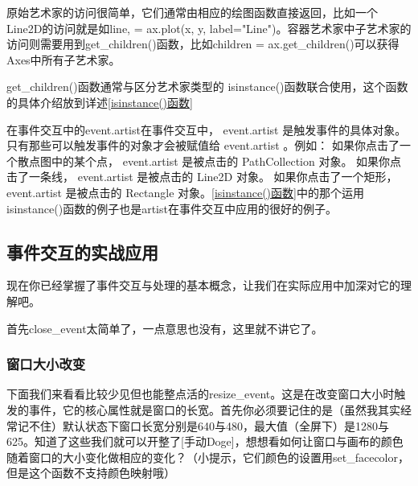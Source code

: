 \documentclass[12pt]{article}
\begin{document}
原始艺术家的访问很简单，它们通常由相应的绘图函数直接返回，比如一个Line2D的访问就是如line, = ax.plot(x, y, label="Line")。容器艺术家中子艺术家的访问则需要用到get\_children()函数，比如children = ax.get\_children()可以获得Axes中所有子艺术家。

get\_children()函数通常与区分艺术家类型的 isinstance()函数联合使用，这个函数的具体介绍放到详述\ref{isinstance()函数}

在事件交互中的event.artist在事件交互中，  event.artist   是触发事件的具体对象。只有那些可以触发事件的对象才会被赋值给   event.artist  。例如： 如果你点击了一个散点图中的某个点，  event.artist   是被点击的   PathCollection   对象。 如果你点击了一条线，  event.artist   是被点击的   Line2D   对象。 如果你点击了一个矩形， event.artist   是被点击的   Rectangle   对象。\ref{isinstance()函数}中的那个运用isinstance()函数的例子也是artist在事件交互中应用的很好的例子。

\subsection{事件交互的实战应用}
现在你已经掌握了事件交互与处理的基本概念，让我们在实际应用中加深对它的理解吧。

首先close\_event太简单了，一点意思也没有，这里就不讲它了。
\subsubsection{窗口大小改变}
下面我们来看看比较少见但也能整点活的resize\_event。这是在改变窗口大小时触发的事件，它的核心属性就是窗口的长宽。首先你必须要记住的是（虽然我其实经常记不住）默认状态下窗口长宽分别是640与480，最大值（全屏下）是1280与625。知道了这些我们就可以开整了[手动Doge]，想想看如何让窗口与画布的颜色随着窗口的大小变化做相应的变化？（小提示，它们颜色的设置用set\_facecolor，但是这个函数不支持颜色映射哦）
\end{document}
